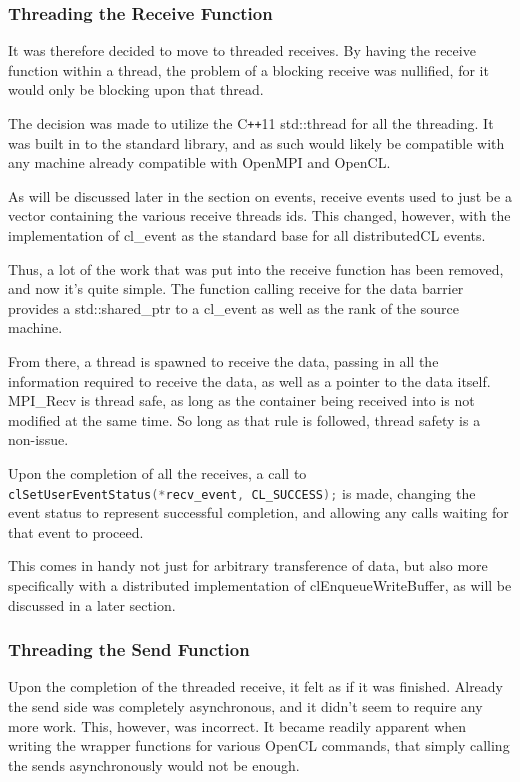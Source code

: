 \documentclass[../thesis.tex]{subfiles}
\begin{document}
  \subsubsection{Threading the Receive Function} %
  \label{ssub:threading_the_receive_function}
      
    It was therefore decided to move to threaded receives. By having the receive function within a thread, the problem of a blocking receive was nullified, for it would only be blocking upon that thread.

    The decision was made to utilize the C\texttt{++}11 std::thread for all the threading. It was built in to the standard library, and as such would likely be compatible with any machine already compatible with OpenMPI and OpenCL.

    As will be discussed later in the section on events, receive events used to just be a vector containing the various receive threads ids. This changed, however, with the implementation of cl\_event as the standard base for all distributedCL events.

    Thus, a lot of the work that was put into the receive function has been removed, and now it's quite simple. The function calling receive for the data barrier provides a std::shared\_ptr to a cl\_event as well as the rank of the source machine.

    From there, a thread is spawned to receive the data, passing in all the information required to receive the data, as well as a pointer to the data itself. MPI\_Recv is thread safe, as long as the container being received into is not modified at the same time. So long as that rule is followed, thread safety is a non-issue.

    Upon the completion of all the receives, a call to \lstinline[language=cpp]{clSetUserEventStatus(*recv_event, CL_SUCCESS);} is made, changing the event status to represent successful completion, and allowing any calls waiting for that event to proceed.

    This comes in handy not just for arbitrary transference of data, but also more specifically with a distributed implementation of clEnqueueWriteBuffer, as will be discussed in a later section.


  \subsubsection{Threading the Send Function} %
  \label{ssub:threading_the_send_function}
    Upon the completion of the threaded receive, it felt as if it was finished. Already the send side was completely asynchronous, and it didn't seem to require any more work. This, however, was incorrect. It became readily apparent when writing the wrapper functions for various OpenCL commands, that simply calling the sends asynchronously would not be enough.
\end{document}
